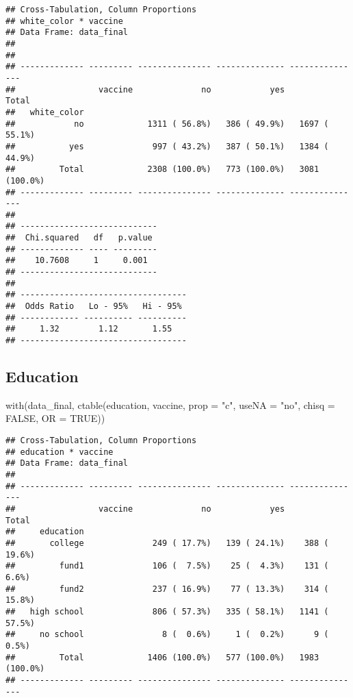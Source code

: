 \documentclass[
]{article}
\newenvironment{Shaded}{\begin{snugshade}}{\end{snugshade}}
\newcommand{\AttributeTok}[1]{\textcolor[rgb]{0.77,0.63,0.00}{#1}}
\newcommand{\ConstantTok}[1]{\textcolor[rgb]{0.00,0.00,0.00}{#1}}
\newcommand{\FunctionTok}[1]{\textcolor[rgb]{0.00,0.00,0.00}{#1}}
\newcommand{\NormalTok}[1]{#1}
\newcommand{\StringTok}[1]{\textcolor[rgb]{0.31,0.60,0.02}{#1}}
\begin{document}
\begin{verbatim}
## Cross-Tabulation, Column Proportions  
## white_color * vaccine  
## Data Frame: data_final  
## 
## 
## ------------- --------- --------------- -------------- ---------------
##                 vaccine              no            yes           Total
##   white_color                                                         
##            no             1311 ( 56.8%)   386 ( 49.9%)   1697 ( 55.1%)
##           yes              997 ( 43.2%)   387 ( 50.1%)   1384 ( 44.9%)
##         Total             2308 (100.0%)   773 (100.0%)   3081 (100.0%)
## ------------- --------- --------------- -------------- ---------------
## 
## ----------------------------
##  Chi.squared   df   p.value 
## ------------- ---- ---------
##    10.7608     1     0.001  
## ----------------------------
## 
## ----------------------------------
##  Odds Ratio   Lo - 95%   Hi - 95% 
## ------------ ---------- ----------
##     1.32        1.12       1.55   
## ----------------------------------
\end{verbatim}

\hypertarget{education}{%
\subsection{Education}\label{education}}

\begin{Shaded}
\begin{Highlighting}[]
\FunctionTok{with}\NormalTok{(data\_final, }\FunctionTok{ctable}\NormalTok{(education, vaccine, }\AttributeTok{prop =} \StringTok{"c"}\NormalTok{, }\AttributeTok{useNA =} \StringTok{"no"}\NormalTok{, }\AttributeTok{chisq =} \ConstantTok{FALSE}\NormalTok{, }\AttributeTok{OR =} \ConstantTok{TRUE}\NormalTok{))}
\end{Highlighting}
\end{Shaded}

\begin{verbatim}
## Cross-Tabulation, Column Proportions  
## education * vaccine  
## Data Frame: data_final  
## 
## ------------- --------- --------------- -------------- ---------------
##                 vaccine              no            yes           Total
##     education                                                         
##       college              249 ( 17.7%)   139 ( 24.1%)    388 ( 19.6%)
##         fund1              106 (  7.5%)    25 (  4.3%)    131 (  6.6%)
##         fund2              237 ( 16.9%)    77 ( 13.3%)    314 ( 15.8%)
##   high school              806 ( 57.3%)   335 ( 58.1%)   1141 ( 57.5%)
##     no school                8 (  0.6%)     1 (  0.2%)      9 (  0.5%)
##         Total             1406 (100.0%)   577 (100.0%)   1983 (100.0%)
## ------------- --------- --------------- -------------- ---------------
\end{verbatim}
\end{document}
